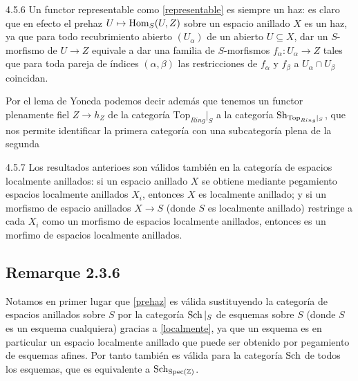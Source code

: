\documentclass[twoside]{article}
\begin{document}
\begin{remarque}{4.5.6}
Un functor representable como \ref{representable} es siempre un haz: es claro que en efecto el prehaz $U\mapsto\operatorname{Hom}_S(U,Z)$ sobre un espacio anillado $X$ es un haz, ya que para todo recubrimiento abierto $(U_\alpha)$ de un abierto $U\subseteq X$, dar un $S$-morfismo de $U\to Z$ equivale a dar una familia de $S$-morfismos $f_\alpha:U_\alpha\to Z$ tales que para toda pareja de índices $(\alpha,\beta)$ las restricciones de $f_\alpha$ y $f_\beta$ a $U_\alpha\cap U_\beta$ coincidan.

Por el lema de Yoneda podemos decir además que tenemos un functor plenamente fiel $Z\to h_Z$ de la categoría $\mathrm{Top}_{Ring}|_S$ a la categoría $\operatorname{Sh}_{\mathrm{Top}_{Ring}|_S}$, que nos permite identificar la primera categoría con una subcategoría plena de la segunda %


\end{remarque}

\begin{remarque}{4.5.7}\label{localmente}
Los resultados anterioes son válidos también en la categoría de espacios localmente anillados: si un espacio anillado $X$ se obtiene mediante pegamiento espacios localmente anillados $X_i$, entonces $X$ es localmente anillado; y si un morfismo de espacio anillados $X\to S$ (donde $S$ es localmente anillado) restringe a cada $X_i$ como un morfismo de espacios localmente anillados, entonces es un morfimo de espacios localmente anillados. 
\end{remarque}



\subsection{Remarque 2.3.6}

Notamos en primer lugar que \ref{prehaz} es válida sustituyendo la categoría de espacios anillados sobre $S$ por la categoría $\operatorname{Sch}|_{S}$ de esquemas sobre $S$ (donde $S$ es un esquema cualquiera) gracias a \ref{localmente}, ya que un esquema es en particular un espacio localmente anillado que puede ser obtenido por pegamiento de esquemas afines. Por tanto también es válida para la categoría $\operatorname{Sch}$ de todos los esquemas, que es equivalente a $\operatorname{Sch}_{\operatorname{Spec}(\mathbb{Z})}$. %
\end{document}
